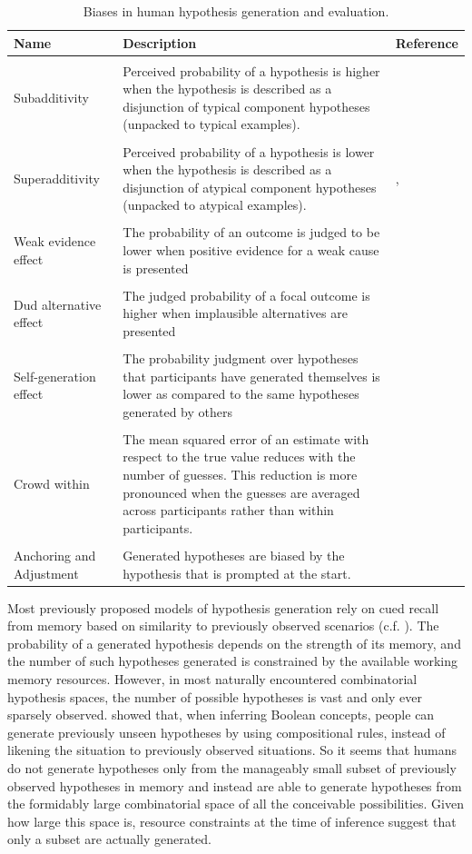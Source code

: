 \begin{table}[htbp]
\centering
\caption{Biases in human hypothesis generation and evaluation.}
\label{tab:biases}
\begin{tabular}{p{}>{\raggedright}p{}>{\raggedright}p{}}
\toprule
\textbf{Name}&\textbf{Description}& \textbf{Reference}\tabularnewline
\midrule \tabularnewline
Subadditivity& Perceived probability of a hypothesis is higher when the hypothesis is described as a disjunction of typical component hypotheses (unpacked to typical examples). & \citet{fox1998belief} \tabularnewline\tabularnewline
Superadditivity& Perceived probability of a hypothesis is lower when the hypothesis is described as a disjunction of atypical component hypotheses (unpacked to atypical examples). & \citet{super}, \citet{hadjichristidis1999opening} \tabularnewline\tabularnewline
Weak evidence effect& The probability of an outcome is judged to be lower when positive evidence for a weak cause is presented & \citet{weak}\tabularnewline\tabularnewline
Dud alternative effect & The judged probability of a focal outcome is higher when implausible alternatives are presented & \citet{dud}\tabularnewline\tabularnewline
Self-generation effect & The probability judgment over hypotheses that participants have generated themselves is lower as compared to the same hypotheses generated by others& \citet{koriat1980,conf} \tabularnewline\tabularnewline
Crowd within & The mean squared error of an estimate with respect to the true value reduces with the number of guesses. This reduction is more pronounced when the guesses are averaged across participants rather than within participants. & \citet{vul08}
\tabularnewline\tabularnewline
Anchoring and Adjustment & Generated hypotheses are biased by the hypothesis that is prompted at the start. & \citet{tversky} \tabularnewline
\bottomrule
\end{tabular}
\end{table}

Most previously proposed models of hypothesis generation rely on cued recall from memory based on similarity to previously observed scenarios (c.f. \citet{Thomas2008, gennaioli2010comes}). The probability of a generated hypothesis depends on the strength of its memory, and the number of such hypotheses generated is constrained by the available working memory resources. However, in most naturally encountered combinatorial hypothesis spaces, the number of possible hypotheses is vast and only ever sparsely observed. \citet{Goodman2008} showed that, when inferring Boolean concepts, people can generate previously unseen hypotheses by using compositional rules, instead of likening the situation to previously observed situations. So it seems that humans do not generate hypotheses only from the manageably small subset of previously observed hypotheses in memory and instead are able to generate hypotheses from the formidably large combinatorial space of all the conceivable possibilities. Given how large this space is, resource constraints at the time of inference suggest that only a subset are actually generated.

